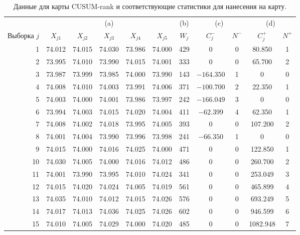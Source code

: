 \begin{table}[!ht]
	\centering
	\caption{Данные для карты CUSUM-rank и соответствующие статистики для нанесения на карту.}
	\label{tab:4.26}
	\small
	\begin{tabular}{@{}rcccccccccc@{}}
		\toprule
		& \multicolumn{5}{c}{(a)} & (b) & \multicolumn{2}{c}{(c)} & \multicolumn{2}{c}{(d)} \\ \cmidrule(lr){2-6}\cmidrule(lr){8-9}\cmidrule(lr){10-11}
		\multicolumn{1}{c}{Выборка \(j\)} & \(X_{j1}\) & \(X_{j2}\) & \(X_{j3}\) & \(X_{j4}\) & \(X_{j5}\) & \(W_j\) & \(C_j^-\) & \(N^-\) & \(C_j^+\) & \(N^+\) \\
		\midrule
		1 & 74.012 & 74.015 & 74.030 & 73.986 & 74.000 & 429 & 0 & 0 & 80.850 & 1 \\
		2 & 73.995 & 74.010 & 73.990 & 74.015 & 74.001 & 333 & 0 & 0 & 65.700 & 2 \\
		3 & 73.987 & 73.999 & 73.985 & 74.000 & 73.990 & 143 & \(-164.350\) & 1 & 0 & 0 \\
		4 & 74.008 & 74.010 & 74.003 & 73.991 & 74.006 & 371 & \(-100.700\) & 2 & 22.350 & 1 \\
		5 & 74.003 & 74.000 & 74.001 & 73.986 & 73.997 & 242 & \(-166.049\) & 3 & 0 & 0 \\
		6 & 73.994 & 74.003 & 74.015 & 74.020 & 74.004 & 411 & \(-62.399\) & 4 & 62.350 & 1 \\
		7 & 74.008 & 74.002 & 74.018 & 73.995 & 74.005 & 393 & 0 & 0 & 107.200 & 2 \\
		8 & 74.001 & 74.004 & 73.990 & 73.996 & 73.998 & 241 & \(-66.350\) & 1 & 0 & 0 \\
		9 & 74.015 & 74.000 & 74.016 & 74.025 & 74.000 & 471 & 0 & 0 & 122.850 & 1 \\
		10 & 74.030 & 74.005 & 74.000 & 74.016 & 74.012 & 486 & 0 & 0 & 260.700 & 2 \\
		11 & 74.001 & 73.990 & 73.995 & 74.010 & 74.024 & 341 & 0 & 0 & 253.049 & 3 \\
		12 & 74.015 & 74.020 & 74.024 & 74.005 & 74.019 & 561 & 0 & 0 & 465.899 & 4 \\
		13 & 74.035 & 74.010 & 74.012 & 74.015 & 74.026 & 576 & 0 & 0 & 693.249 & 5 \\
		14 & 74.017 & 74.013 & 74.036 & 74.025 & 74.026 & 602 & 0 & 0 & 946.599 & 6 \\
		15 & 74.010 & 74.005 & 74.029 & 74.000 & 74.020 & 485 & 0 & 0 & 1082.948 & 7 \\
		\bottomrule
	\end{tabular}
\end{table}

